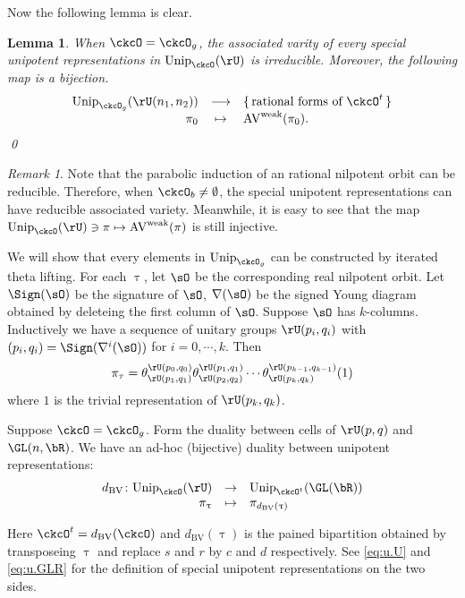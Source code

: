 \documentclass[12pt,a4paper]{amsart}
\newcommand{\AV}{\mathrm{AV}}
\def\DD{\nabla}
\numberwithin{equation}{section}
\newtheorem{lem}[thm]{Lemma}
\theoremstyle{remark}
\newtheorem*{remark}{Remark}
\def\Unip{\mathrm{Unip}}
\def\wAV{\AV^{\mathrm{weak}}}
\def\dBV{d_{\mathrm{BV}}}
\def\DD{\nabla}
\begin{document}
Now the following lemma is clear. 
\begin{lem}
When $\ckcO=\ckcO_g$, the associated varity of every special unipotent representations in $\Unip_\ckcO(\rU)$  
is irreducible. Moreover, the following map  is a bijection. 
\[  
  \begin{array}{rcl}
  \Unip_{\ckcO_g}(\rU(n_1,n_2)) &\longrightarrow& \set{\text{rational forms of $\ckcO^t$}}\\
  \pi_0 & \mapsto & \wAV(\pi_0).
  \end{array}
\]
\qed
\end{lem}
\begin{remark}
  Note that the parabolic induction of an rational nilpotent orbit can be reducible. 
  Therefore, when $\ckcO_b\neq \emptyset$, the special unipotent representations can have
  reducible associated variety. Meanwhile, it is easy to see that the map
  $\Unip_{\ckcO}(\rU) \ni \pi \mapsto\wAV(\pi)$ is still injective. 
\end{remark}

We will show that every elements in $\Unip_{\ckcO_g}$ can be constructed by iterated theta lifting.  
For each $\uptau$, let $\sO$ be the corresponding real nilpotent orbit. Let
$\Sign(\sO)$ be the signature of $\sO$, $\DD(\sO)$ be the signed Young diagram
obtained by deleteing the first column of $\sO$. 
Suppose $\sO$ has $k$-columns. Inductively we have a sequence of unitary groups
$\rU(p_i,q_i)$ with $(p_i,q_i) = \Sign(\DD^i(\sO))$ for $i=0, \cdots, k$. Then 
\begin{equation}\label{eq:u.U}
  \pi_\tau = \theta^{\rU(p_0,q_0)}_{\rU(p_1,q_1)} \theta^{\rU(p_1,q_1)}_{\rU(p_2,q_2)}\cdots   
\theta^{\rU(p_{k-1},q_{k-1})}_{\rU(p_k,q_k)}(1)
\end{equation}
where $1$ is the trivial representation of $\rU(p_k,q_k)$. 


Suppose $\ckcO = \ckcO_g$. Form the duality between cells of $\rU(p,q)$ and
$\GL(n,\bR)$. We have an ad-hoc (bijective) duality between unipotent
representations: 
\[
  \begin{array}{rcl}
 \dBV\colon \Unip_{\ckcO}(\rU)& \rightarrow &\Unip_{\ckcO^t}(\GL(\bR)) \\
 \pi_\uptau &\mapsto& \pi_{\dBV(\uptau)} \\ 
  \end{array}
\]

Here $\ckcO^t = \dBV(\ckcO)$ and $\dBV(\uptau)$ is the pained bipartition
obtained by transposeing $\uptau$ and replace $s$ and $r$ by $c$ and $d$
respectively. See \eqref{eq:u.U} and \eqref{eq:u.GLR} for the definition of
special unipotent representations on the two sides.  
\end{document}
